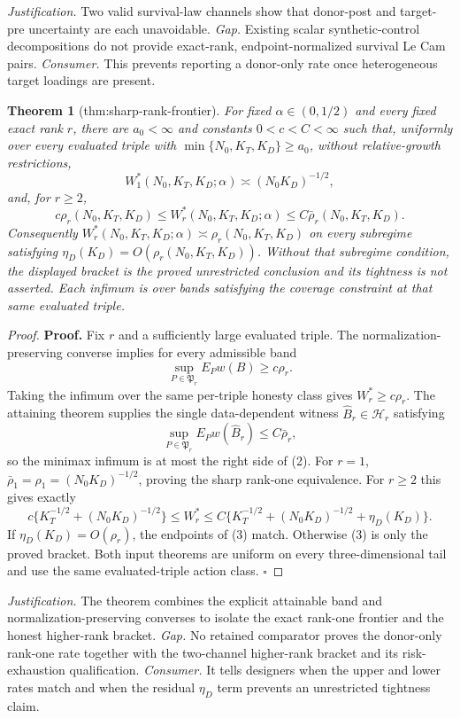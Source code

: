 \documentclass{article}
\newtheorem{theorem}{Theorem}
\begin{document}
\par\smallskip\noindent \textit{Justification.} Two valid survival-law channels show that donor-post and target-pre uncertainty are each unavoidable. \textit{Gap.} Existing scalar synthetic-control decompositions do not provide exact-rank, endpoint-normalized survival Le Cam pairs. \textit{Consumer.} This prevents reporting a donor-only rate once heterogeneous target loadings are present.

\begin{theorem}[thm:sharp-rank-frontier]\label{thm:sharp-rank-frontier}
For fixed \(\alpha\in(0,1/2)\) and every fixed exact rank \(r\), there are \(a_0<\infty\) and constants \(0<c<C<\infty\) such that, uniformly over every evaluated triple with \(\min\{N_0,K_T,K_D\}\ge a_0\), without relative-growth restrictions,
\[
 W_1^*(N_0,K_T,K_D;\alpha)\asymp(N_0K_D)^{-1/2},
\]
and, for \(r\ge2\),
\[
 c\rho_r(N_0,K_T,K_D)
 \le W_r^*(N_0,K_T,K_D;\alpha)
 \le C\bar\rho_r(N_0,K_T,K_D).
\]
Consequently \(W_r^*(N_0,K_T,K_D;\alpha)\asymp\rho_r(N_0,K_T,K_D)\) on every subregime satisfying \(\eta_D(K_D)=O(\rho_r(N_0,K_T,K_D))\).  Without that subregime condition, the displayed bracket is the proved unrestricted conclusion and its tightness is not asserted.  Each infimum is over bands satisfying the coverage constraint at that same evaluated triple.
\end{theorem}
\begin{proof}
\textbf{Proof.}
Fix \(r\) and a sufficiently large evaluated triple.  The normalization-preserving converse implies for every admissible band
\[
 \sup_{P\in\mathfrak P_r}E_Pw(B)\ge c\rho_r.             \tag{1}
\]
Taking the infimum over the same per-triple honesty class gives \(W_r^*\ge c\rho_r\).  The attaining theorem supplies the single data-dependent witness \(\widehat B_r\in\mathcal H_r\) satisfying
\[
 \sup_{P\in\mathfrak P_r}E_Pw(\widehat B_r)\le C\bar\rho_r, \tag{2}
\]
so the minimax infimum is at most the right side of (2).  For \(r=1\), \(\bar\rho_1=\rho_1=(N_0K_D)^{-1/2}\), proving the sharp rank-one equivalence.  For \(r\ge2\) this gives exactly
\[
 c\{K_T^{-1/2}+(N_0K_D)^{-1/2}\}
 \le W_r^*
 \le C\{K_T^{-1/2}+(N_0K_D)^{-1/2}+\eta_D(K_D)\}.       \tag{3}
\]
If \(\eta_D(K_D)=O(\rho_r)\), the endpoints of (3) match.  Otherwise (3) is only the proved bracket.  Both input theorems are uniform on every three-dimensional tail and use the same evaluated-triple action class. \(\square\)
\end{proof}
\par\smallskip\noindent \textit{Justification.} The theorem combines the explicit attainable band and normalization-preserving converses to isolate the exact rank-one frontier and the honest higher-rank bracket. \textit{Gap.} No retained comparator proves the donor-only rank-one rate together with the two-channel higher-rank bracket and its risk-exhaustion qualification. \textit{Consumer.} It tells designers when the upper and lower rates match and when the residual \(\eta_D\) term prevents an unrestricted tightness claim.
\end{document}
